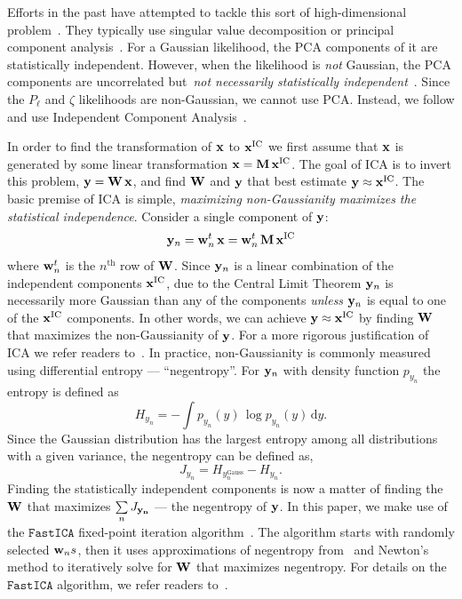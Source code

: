 \documentclass[12pt, letterpaper, preprint]{aastex}
\newcommand{\beq}{\begin{equation}}
\newcommand{\eeq}{\end{equation}}
\begin{document}
Efforts in the past have attempted to tackle this sort of 
high-dimensional problem~\citep[\emph{e.g.}][]{scoccimarro2000,eisenstein2001,gaztanaga2005,norberg2009,sinha2017a}.
They typically use singular value decomposition or principal 
component analysis~\citep[PCA;][]{Press:1992:NRC:148286}. For a Gaussian
likelihood, the PCA components of it are statistically independent. 
However, when the likelihood is \emph{not} Gaussian, the PCA components 
are uncorrelated but~\emph{not necessarily statistically independent}~\citep{hartlap2009}. 
Since the $P_\ell$ and $\zeta$ likelihoods are non-Gaussian, we cannot 
use PCA. Instead, we follow \cite{hartlap2009} and use Independent 
Component Analysis~\citep[ICA][]{herault1984,comon1994,hyvarinen2000,
hyvarinen2001independent}. 

In order to find the transformation of ${\bf x}$ to ${\bf x}^\mathrm{IC}$ 
we first assume that ${\bf x}$ is generated by some linear transformation
${\bf x} = {\bf M}\,{\bf x}^\mathrm{IC}$. The goal of ICA is to invert 
this problem, ${\bf y} = {\bf W}\,{\bf x}$, and find ${\bf W}$ and ${\bf y}$ 
that best estimate ${\bf y} \approx {\bf x}^\mathrm{IC}$. The basic 
premise of ICA is simple, \emph{maximizing non-Gaussianity maximizes the 
statistical independence}. Consider a single component of ${\bf y}$: 
\beq
{\bf y}_n = {\bf w}_n^{\tiny t}\,{\bf x} = {\bf w}_n^{\tiny t}\,{\bf M}\,{\bf x}^\mathrm{IC} 
\eeq
where ${\bf w}_n^{\tiny t}$ is the $n^\mathrm{th}$ row of ${\bf W}$. 
Since ${\bf y}_n$ is a linear combination of the independent 
components ${\bf x}^\mathrm{IC}$, due to the Central Limit Theorem 
${\bf y}_n$ is necessarily more Gaussian than any of the 
components \emph{unless} ${\bf y}_n$ is equal to one of the 
${\bf x}^\mathrm{IC}$ components. In other words, we can achieve 
${\bf y} \approx {\bf x}^\mathrm{IC}$ by finding ${\bf W}$ that 
maximizes the non-Gaussianity of ${\bf y}$. For a more rigorous 
justification of ICA we refer readers to~\cite{hyvarinen2001independent}. 
In practice, non-Gaussianity is commonly measured using differential
entropy --- ``negentropy''. For ${\bf y}_n$ with density function 
$p_{y_n}$ the entropy is defined as
\beq
H_{y_n} =  - \int p_{y_n} (y)\, \log p_{y_n}(y)\, \mathrm{d}y. 
\eeq
Since the Gaussian distribution has the largest entropy among all 
distributions with a given variance, the negentropy can be defined 
as, 
\beq
J_{y_n} = H_{y_n^\mathrm{Gauss}} - H_{y_n}. 
\eeq
Finding the statistically independent components is now a matter
of finding the ${\bf W}$ that maximizes $\sum\limits_{n} J_{\bf y_n}$
--- the negentropy of ${\bf y}$. In this paper, we make use of the 
$\mathtt{FastICA}$ fixed-point iteration algorithm~\citep{hyvarinen1999}. 
The algorithm starts with randomly selected ${\bf w}_ns$, then it uses 
approximations of negentropy from~\cite{hyvarinen1998} and Newton's method 
to iteratively solve for ${\bf W}$ that maximizes negentropy. For details 
on the $\mathtt{FastICA}$ algorithm, we refer readers to~\cite{hyvarinen1999}.
\end{document}
